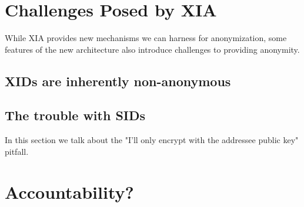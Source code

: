 \documentclass{article}
\begin{document}
\section{Challenges Posed by XIA}
\label{sec:xia-challenges}
While XIA provides new mechanisms we can harness for anonymization, some features of the new architecture also introduce challenges to providing anonymity.
\subsection{XIDs are inherently non-anonymous}

\subsection{The trouble with SIDs}
In this section we talk about the "I'll only encrypt with the addressee public key" pitfall.


\section{Accountability?}
\end{document}
